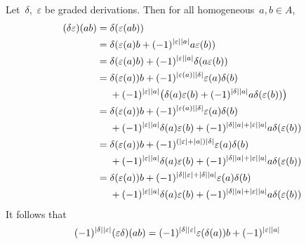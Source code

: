 \begin{enumerate}
    Let~$\delta$,~$\varepsilon$ be graded derivations.
    Then for all homogeneous~$a, b \in A$,
    \begingroup
    \allowdisplaybreaks
    \begin{align*}
      (\delta \varepsilon)(ab)
      ={}&
      \delta( \varepsilon(ab) )
      \\
      ={}&
      \delta( \varepsilon(a) b + (-1)^{\lvert\varepsilon\rvert \lvert a\rvert} a \varepsilon(b) )
      \\
      ={}&
        \delta( \varepsilon(a) b )
      + (-1)^{\lvert\varepsilon\rvert \lvert a\rvert}
        \delta( a \varepsilon(b) )
      \\
      ={}&
        \delta(\varepsilon(a)) b
      + (-1)^{\lvert\varepsilon(a)\rvert \lvert\delta\rvert}
        \varepsilon(a) \delta(b)
      \\
      {}&
      + (-1)^{\lvert\varepsilon\rvert \lvert a\rvert}
        \bigl(
            \delta(a)\varepsilon(b)
          + (-1)^{\lvert\delta\rvert \lvert a\rvert} a \delta(\varepsilon(b))
        \bigr)
      \\
      ={}&
        \delta(\varepsilon(a)) b
      + (-1)^{\lvert\varepsilon(a)\rvert \lvert\delta\rvert}
        \varepsilon(a) \delta(b)
      \\
      {}&
      + (-1)^{\lvert\varepsilon\rvert \lvert a\rvert} \delta(a)\varepsilon(b)
      + (-1)^{\lvert\delta\rvert \lvert a\rvert + \lvert\varepsilon\rvert \lvert a\rvert}
        a \delta(\varepsilon(b))
      \\
      ={}&
        \delta(\varepsilon(a)) b
      + (-1)^{(\lvert\varepsilon\rvert + \lvert a\rvert) \lvert\delta\rvert}
        \varepsilon(a) \delta(b)
      \\
      {}&
      + (-1)^{\lvert\varepsilon\rvert \lvert a\rvert}
        \delta(a)\varepsilon(b)
      + (-1)^{\lvert\delta\rvert \lvert a\rvert + \lvert\varepsilon\rvert \lvert a\rvert}
        a \delta(\varepsilon(b))
      \\
      ={}&
        \delta(\varepsilon(a)) b
      + (-1)^{\lvert\delta\rvert \lvert\varepsilon\rvert + \lvert\delta\rvert \lvert a\rvert}
        \varepsilon(a) \delta(b)
      \\
      {}&
      + (-1)^{\lvert\varepsilon\rvert \lvert a\rvert}
        \delta(a) \varepsilon(b)
      + (-1)^{\lvert\delta\rvert \lvert a\rvert + \lvert\varepsilon\rvert \lvert a\rvert}
        a \delta(\varepsilon(b))
    \end{align*}
    \endgroup
    It follows that
    \begin{align*}
      (-1)^{\hdeg{\delta} \hdeg{\varepsilon}}
      (\varepsilon \delta)(ab)
      ={}&
        (-1)^{\hdeg{\delta} \hdeg{\varepsilon}}
        \varepsilon(\delta(a)) b
      + (-1)^{\hdeg{\varepsilon} \hdeg{a}}

\end{align*}
\end{enumerate}
